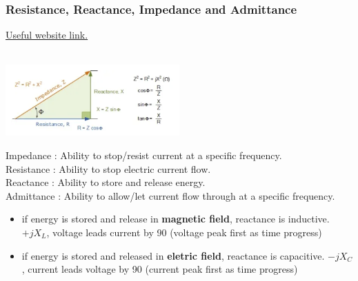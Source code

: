 \documentclass{article}
\begin{document}
	\subsubsection{Resistance, Reactance, Impedance and Admittance}
	\href{https://tech-notes.quantmasters.in/concept-of-impedance-admittance-2/}{Useful website link.} \\\\
	\begin{center}
		\includegraphics[width=0.5\textwidth]{imgs/impedancetriangle.png} \\
	\end{center}
	Impedance : Ability to stop/resist current at a specific frequency. \\
	Resistance : Ability to stop electric current flow. \\
	Reactance : Ability to store and release energy. \\
	Admittance : Ability to allow/let current flow through at a specific frequency. \\
	\begin{itemize}
		\item if energy is stored and release in \textbf{magnetic field}, reactance is inductive. $+jX_L$, voltage leads current by 90 (voltage peak first as time progress)
		\item if energy is stored and released in \textbf{eletric field}, reactance is capacitive. $-jX_C$, current leads voltage by 90 (current peak first as time progress)
	\end{itemize}
	
\end{document}
